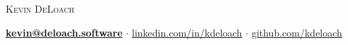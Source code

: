 \documentclass[12pt,a4paper]{article}
\newcommand{\sectionhead}{\normalfont\normalsize\scshape}
\begin{document}
\begin{center}
\noindent
{\huge\textsc{Kevin DeLoach}}

\vspace{2mm}

\noindent
\faEnvelope{ }\href{mailto:kevin@deloach.software}{\bfseries  kevin@deloach.software} $\cdot$
\faLinkedin{ }\href{https://linkedin.com/in/kdeloach}{linkedin.com/in/kdeloach} $\cdot$
\faGithub{ }\href{https://github.com/kdeloach}{github.com/kdeloach}
\end{center}

\noindent\hrulefill

\end{document}
